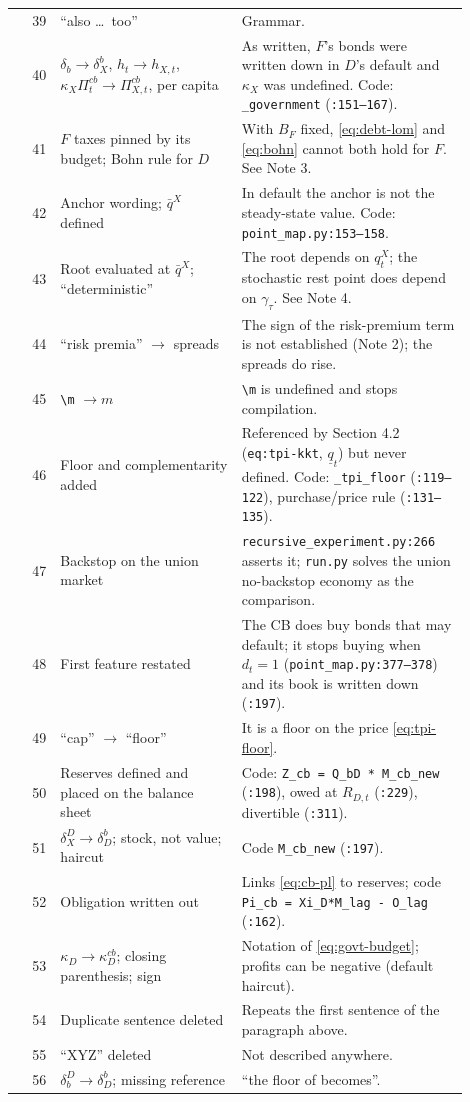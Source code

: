 \documentclass[11pt]{article}
\begin{document}
\begin{longtable}{@{}r p{0.40\linewidth} p{0.50\linewidth}@{}}
39 & ``also \dots\ too'' & Grammar. \\
40 & $\delta_b\to\delta^b_X$, $h_t\to h_{X,t}$, $\kappa_X\Pi^{cb}_t\to\Pi^{cb}_{X,t}$, per capita & As written, $F$'s bonds were written down in $D$'s default and $\kappa_X$ was undefined. Code: \texttt{\_government} (\texttt{:151--167}). \\
41 & $F$ taxes pinned by its budget; Bohn rule for $D$ & With $B_F$ fixed, \eqref{eq:debt-lom} and \eqref{eq:bohn} cannot both hold for $F$. See Note 3. \\
42 & Anchor wording; $\bar q^X$ defined & In default the anchor is not the steady-state value. Code: \texttt{point\_map.py:153--158}. \\
43 & Root evaluated at $\bar q^X$; ``deterministic'' & The root depends on $q^X_t$; the stochastic rest point does depend on $\gamma_\tau$. See Note 4. \\
44 & ``risk premia'' $\to$ spreads & The sign of the risk-premium term is not established (Note 2); the spreads do rise. \\
45 & \verb|\m| $\to m$ & \verb|\m| is undefined and stops compilation. \\
46 & Floor and complementarity added & Referenced by Section 4.2 (\verb|eq:tpi-kkt|, $\underline q_t$) but never defined. Code: \texttt{\_tpi\_floor} (\texttt{:119--122}), purchase/price rule (\texttt{:131--135}). \\
47 & Backstop on the union market & \texttt{recursive\_experiment.py:266} asserts it; \texttt{run.py} solves the union no-backstop economy as the comparison. \\
48 & First feature restated & The CB does buy bonds that may default; it stops buying when $d_t=1$ (\texttt{point\_map.py:377--378}) and its book is written down (\texttt{:197}). \\
49 & ``cap'' $\to$ ``floor'' & It is a floor on the price \eqref{eq:tpi-floor}. \\
50 & Reserves defined and placed on the balance sheet & Code: \texttt{Z\_cb = Q\_bD * M\_cb\_new} (\texttt{:198}), owed at $R_{D,t}$ (\texttt{:229}), divertible (\texttt{:311}). \\
51 & $\delta_X^D\to\delta^b_D$; stock, not value; haircut & Code \texttt{M\_cb\_new} (\texttt{:197}). \\
52 & Obligation written out & Links \eqref{eq:cb-pl} to reserves; code \texttt{Pi\_cb = Xi\_D*M\_lag - O\_lag} (\texttt{:162}). \\
53 & $\kappa_D\to\kappa^{cb}_D$; closing parenthesis; sign & Notation of \eqref{eq:govt-budget}; profits can be negative (default haircut). \\
54 & Duplicate sentence deleted & Repeats the first sentence of the paragraph above. \\
55 & ``XYZ'' deleted & Not described anywhere. \\
56 & $\delta_b^D\to\delta^b_D$; missing reference & ``the floor of becomes''. \\
\bottomrule
\end{longtable}
\end{document}
